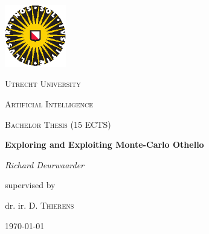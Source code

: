 \documentclass[
11pt, %
english, %
singlespacing, %
headsepline, %
]{MastersDoctoralThesis} %
\author{Richard \textsc{Deurwaarder}} %
\begin{document}
\frontmatter

\begin{titlepage}
	\centering
	\includegraphics[width=0.20\textwidth]{images/uu-logo}\par\vspace{1cm}
	{\scshape\LARGE Utrecht University \par}
	\vspace{0.5cm}
	{\scshape\Large Artificial Intelligence\par}
	{\scshape\Large Bachelor Thesis (15 ECTS)\par}
	\vspace{1.5cm}
	{\huge\bfseries Exploring and Exploiting Monte-Carlo Othello\par}
	\vspace{0.5cm}
	{\Large\itshape Richard Deurwaarder\par}
	\vfill
	supervised by\par
	dr. ir. D. \textsc{Thierens}
	
	\vfill
	
	{\large \today\par}
\end{titlepage}


\begin{abstract}
	\addchaptertocentry{\abstractname} %
	The Exploration versus Exploitation dilemma is a trade-off dilemma which presents itself in many algorithms including Monte Carlo Tree Search with the UCT policy. UCT is designed to control this trade-off and is influenced via a specific parameter: the exploration parameter. A faulty assumption is sometimes made that this exploration parameter is robust and has a sane default value. In this paper, I will use the board game Othello to show the influence of the exploration parameter and show that using this `default' value rather than a value tuned for a specific problem can have dramatic performance implications.\\ \\
	{\footnotesize \textbf{Keywords:} \keywordnames}
\end{abstract}
\end{document}
